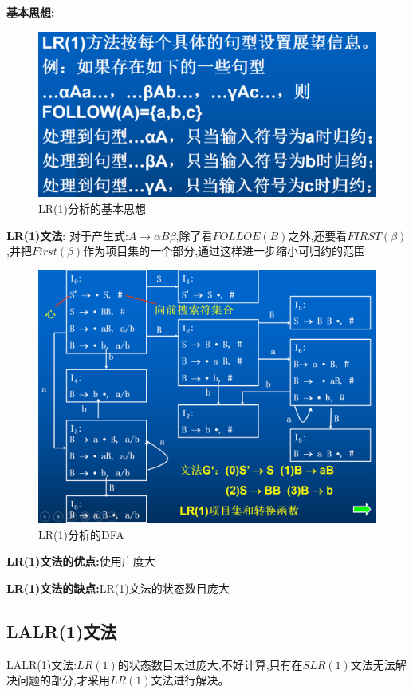 \documentclass[UTF8,a4paper]{ctexart}
\newcommand{\spaceline}{\vspace{\baselineskip}}
\begin{document}
 \spaceline
 \textbf{基本思想:}
 \begin{figure}[H]
  \centering
  \includegraphics[scale = 0.3]{assets/CompilerConstructionPrinciples_3b12f.png}
  \caption{LR(1)分析的基本思想}
 \end{figure}

 \spaceline
 \textbf{LR(1)文法}:
 对于产生式:$A\to\alpha B \beta$,除了看$FOLLOE(B)$之外,还要看$FIRST(\beta)$,并把$First(\beta)$作为项目集的一个部分,通过这样进一步缩小可归约的范围

 \begin{figure}[H]
  \centering
  \includegraphics[scale = 0.3]{assets/CompilerConstructionPrinciples_87792.png}
  \caption{LR(1)分析的DFA}
 \end{figure}

 \spaceline
 \textbf{LR(1)文法的优点:}使用广度大

 \textbf{LR(1)文法的缺点:}LR(1)文法的状态数目庞大

 \subsection{LALR(1)文法}
 LALR(1)文法:$LR(1)$的状态数目太过庞大,不好计算,只有在$SLR(1)$文法无法解决问题的部分,才采用$LR(1)$文法进行解决。
\end{document}

